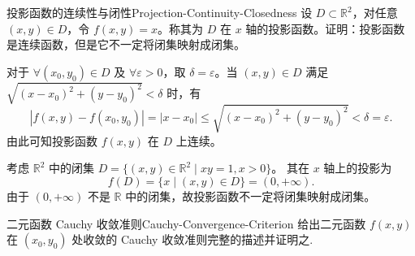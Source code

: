 \begin{problem}{投影函数的连续性与闭性}{Projection-Continuity-Closedness}
    设 $D \subset \mathbb{R}^2$，对任意 $(x, y) \in D$，令 $f(x, y) = x$。称其为 $D$ 在 $x$ 轴的投影函数。证明：投影函数是连续函数，但是它不一定将闭集映射成闭集。
\end{problem}

\begin{myproof}

    对于 $\forall (x_0, y_0) \in D$ 及 $\forall \varepsilon > 0$，取 $\delta = \varepsilon$。当 $(x, y) \in D$ 满足 $\sqrt{(x - x_0)^2 + (y - y_0)^2} < \delta$ 时，有
    \begin{equation}
        |f(x, y) - f(x_0, y_0)| = |x - x_0| \le \sqrt{(x - x_0)^2 + (y - y_0)^2} < \delta = \varepsilon.
    \end{equation}
    由此可知投影函数 $f(x, y)$ 在 $D$ 上连续。


    考虑 $\mathbb{R}^2$ 中的闭集 $D = \{(x, y) \in \mathbb{R}^2 \mid xy = 1, x > 0\}$。
    其在 $x$ 轴上的投影为
    \begin{equation}
        f(D) = \{x \mid (x, y) \in D\} = (0, +\infty).
    \end{equation}
    由于 $(0, +\infty)$ 不是 $\mathbb{R}$ 中的闭集，故投影函数不一定将闭集映射成闭集。
\end{myproof}


\begin{problem}{二元函数 Cauchy 收敛准则}{Cauchy-Convergence-Criterion}
    给出二元函数 $f(x, y)$ 在 $(x_0, y_0)$ 处收敛的 Cauchy 收敛准则完整的描述并证明之.
\end{problem}

